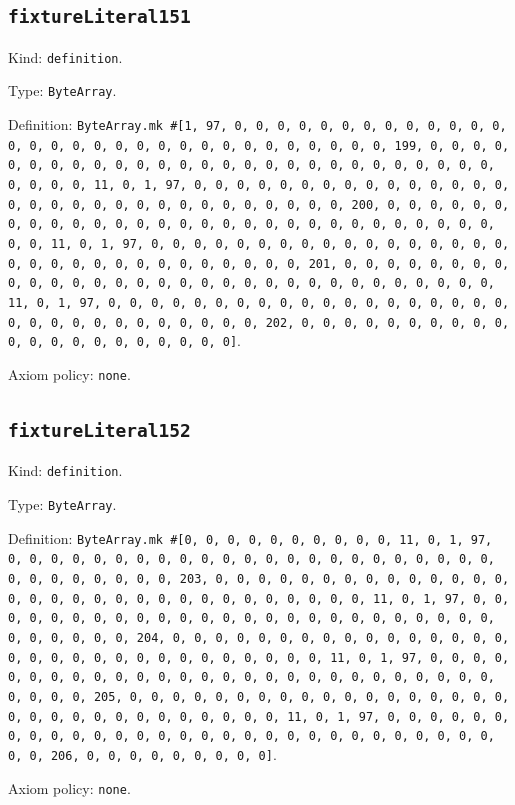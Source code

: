 \documentclass[11pt]{article}
\begin{document}
\subsection*{\texttt{fixtureLiteral151}}
\noindent Kind: \texttt{definition}.\par
\noindent Type: \texttt{ByteArray}.\par
\noindent Definition: \texttt{ByteArray.mk \#[1, 97, 0, 0, 0, 0, 0, 0, 0, 0, 0, 0, 0, 0, 0, 0, 0, 0, 0, 0, 0, 0, 0, 0, 0, 0, 0, 0, 0, 0, 0, 0, 0, 199, 0, 0, 0, 0, 0, 0, 0, 0, 0, 0, 0, 0, 0, 0, 0, 0, 0, 0, 0, 0, 0, 0, 0, 0, 0, 0, 0, 0, 0, 0, 0, 11, 0, 1, 97, 0, 0, 0, 0, 0, 0, 0, 0, 0, 0, 0, 0, 0, 0, 0, 0, 0, 0, 0, 0, 0, 0, 0, 0, 0, 0, 0, 0, 0, 0, 0, 200, 0, 0, 0, 0, 0, 0, 0, 0, 0, 0, 0, 0, 0, 0, 0, 0, 0, 0, 0, 0, 0, 0, 0, 0, 0, 0, 0, 0, 0, 0, 0, 11, 0, 1, 97, 0, 0, 0, 0, 0, 0, 0, 0, 0, 0, 0, 0, 0, 0, 0, 0, 0, 0, 0, 0, 0, 0, 0, 0, 0, 0, 0, 0, 0, 0, 0, 201, 0, 0, 0, 0, 0, 0, 0, 0, 0, 0, 0, 0, 0, 0, 0, 0, 0, 0, 0, 0, 0, 0, 0, 0, 0, 0, 0, 0, 0, 0, 0, 11, 0, 1, 97, 0, 0, 0, 0, 0, 0, 0, 0, 0, 0, 0, 0, 0, 0, 0, 0, 0, 0, 0, 0, 0, 0, 0, 0, 0, 0, 0, 0, 0, 0, 0, 202, 0, 0, 0, 0, 0, 0, 0, 0, 0, 0, 0, 0, 0, 0, 0, 0, 0, 0, 0, 0, 0]}.\par
\noindent Axiom policy: \texttt{none}.\par
\subsection*{\texttt{fixtureLiteral152}}
\noindent Kind: \texttt{definition}.\par
\noindent Type: \texttt{ByteArray}.\par
\noindent Definition: \texttt{ByteArray.mk \#[0, 0, 0, 0, 0, 0, 0, 0, 0, 0, 11, 0, 1, 97, 0, 0, 0, 0, 0, 0, 0, 0, 0, 0, 0, 0, 0, 0, 0, 0, 0, 0, 0, 0, 0, 0, 0, 0, 0, 0, 0, 0, 0, 0, 0, 203, 0, 0, 0, 0, 0, 0, 0, 0, 0, 0, 0, 0, 0, 0, 0, 0, 0, 0, 0, 0, 0, 0, 0, 0, 0, 0, 0, 0, 0, 0, 0, 11, 0, 1, 97, 0, 0, 0, 0, 0, 0, 0, 0, 0, 0, 0, 0, 0, 0, 0, 0, 0, 0, 0, 0, 0, 0, 0, 0, 0, 0, 0, 0, 0, 0, 0, 204, 0, 0, 0, 0, 0, 0, 0, 0, 0, 0, 0, 0, 0, 0, 0, 0, 0, 0, 0, 0, 0, 0, 0, 0, 0, 0, 0, 0, 0, 0, 0, 11, 0, 1, 97, 0, 0, 0, 0, 0, 0, 0, 0, 0, 0, 0, 0, 0, 0, 0, 0, 0, 0, 0, 0, 0, 0, 0, 0, 0, 0, 0, 0, 0, 0, 0, 205, 0, 0, 0, 0, 0, 0, 0, 0, 0, 0, 0, 0, 0, 0, 0, 0, 0, 0, 0, 0, 0, 0, 0, 0, 0, 0, 0, 0, 0, 0, 0, 11, 0, 1, 97, 0, 0, 0, 0, 0, 0, 0, 0, 0, 0, 0, 0, 0, 0, 0, 0, 0, 0, 0, 0, 0, 0, 0, 0, 0, 0, 0, 0, 0, 0, 0, 206, 0, 0, 0, 0, 0, 0, 0, 0, 0]}.\par
\noindent Axiom policy: \texttt{none}.\par
\end{document}
